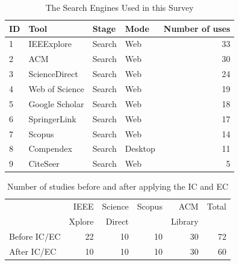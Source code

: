 \begin{table}[htbp]
	\centering
	\caption{The Search Engines Used in this Survey}
	\label{tab:databases}
	\begin{tabular}{llllr}
		\hline
		ID & Tool           & Stage  & Mode    & Number of uses \\
		\hline
		1  & IEEExplore     & Search & Web     & 33             \\
		2  & ACM            & Search & Web     & 30             \\
		3  & ScienceDirect  & Search & Web     & 24             \\
		4  & Web of Science & Search & Web     & 19             \\
		5  & Google Scholar & Search & Web     & 18             \\
		6  & SpringerLink   & Search & Web     & 17             \\
		7  & Scopus         & Search & Web     & 14             \\
		8  & Compendex      & Search & Desktop & 11             \\
		9  & CiteSeer       & Search & Web     & 5              \\
		\hline
	\end{tabular}
\end{table}

\begin{table}[htbp]
	\centering
	\caption{\footnotesize Number of studies before and after applying the IC and EC}
	\label{tab:criteria}
	\begin{tabular}{lrrrrr}
		\hline
		                           & \footnotesize IEEE   & \footnotesize Science & \footnotesize Scopus & \footnotesize ACM     & \footnotesize Total \\
		                           & \footnotesize Xplore & \footnotesize Direct  &                      & \footnotesize Library &                     \\
		\hline
		\footnotesize Before IC/EC & 22                   & 10                    & 10                   & 30                    & 72                  \\
		\footnotesize After IC/EC  & 10                   & 10                    & 10                   & 30                    & 60                  \\
		\hline
	\end{tabular}
\end{table}


